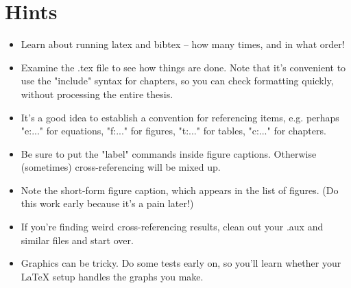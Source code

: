 \chapter{\label{a:hints}Hints}

\begin{itemize}


	\item Learn about running latex and bibtex -- how many times, and in what order!

 \item Examine the .tex file to see how things are done. Note that it's convenient to use the "include{}"
syntax for chapters, so you can check formatting quickly, without processing the entire thesis.

	\item It's a good idea to establish a convention for referencing items, e.g. perhaps "e:..." for
equations, "f:..." for figures, "t:..." for tables, "c:..." for chapters.


	\item Be sure to put the "label" commands inside figure captions. Otherwise (sometimes) cross-referencing will be mixed up.
	
	\item Note the short-form figure caption, which appears in the list of figures.  (Do this work early because it's a pain later!)
	
	\item If you're finding weird cross-referencing results, clean out your .aux and similar files and start over.

 	\item Graphics can be tricky. Do some tests early on, so you'll learn whether your LaTeX setup
    handles the graphs you make. 

\end{itemize}
